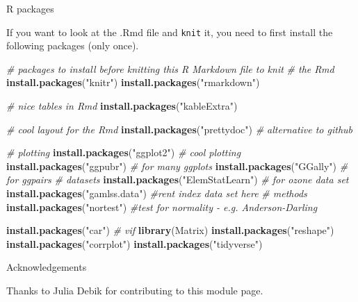 \documentclass[10pt,ignorenonframetext,]{beamer}
\newenvironment{Shaded}{\begin{snugshade}}{\end{snugshade}}
\newcommand{\KeywordTok}[1]{\textcolor[rgb]{0.13,0.29,0.53}{\textbf{#1}}}
\newcommand{\StringTok}[1]{\textcolor[rgb]{0.31,0.60,0.02}{#1}}
\newcommand{\CommentTok}[1]{\textcolor[rgb]{0.56,0.35,0.01}{\textit{#1}}}
\newcommand{\NormalTok}[1]{#1}
\begin{document}
\begin{frame}[fragile]{ R packages}

If you want to look at the .Rmd file and \texttt{knit} it, you need to
first install the following packages (only once).

\begin{Shaded}
\begin{Highlighting}[]
\CommentTok{# packages to install before knitting this R Markdown file to knit}
\CommentTok{# the Rmd}
\KeywordTok{install.packages}\NormalTok{(}\StringTok{"knitr"}\NormalTok{)}
\KeywordTok{install.packages}\NormalTok{(}\StringTok{"rmarkdown"}\NormalTok{)}

\CommentTok{# nice tables in Rmd}
\KeywordTok{install.packages}\NormalTok{(}\StringTok{"kableExtra"}\NormalTok{)}

\CommentTok{# cool layout for the Rmd}
\KeywordTok{install.packages}\NormalTok{(}\StringTok{"prettydoc"}\NormalTok{)  }\CommentTok{# alternative to github}

\CommentTok{# plotting}
\KeywordTok{install.packages}\NormalTok{(}\StringTok{"ggplot2"}\NormalTok{)  }\CommentTok{# cool plotting}
\KeywordTok{install.packages}\NormalTok{(}\StringTok{"ggpubr"}\NormalTok{)  }\CommentTok{# for many ggplots}
\KeywordTok{install.packages}\NormalTok{(}\StringTok{"GGally"}\NormalTok{)  }\CommentTok{# for ggpairs}
\CommentTok{# datasets}
\KeywordTok{install.packages}\NormalTok{(}\StringTok{"ElemStatLearn"}\NormalTok{)  }\CommentTok{# for ozone data set}
\KeywordTok{install.packages}\NormalTok{(}\StringTok{"gamlss.data"}\NormalTok{)  }\CommentTok{#rent index data set here}
\CommentTok{# methods}
\KeywordTok{install.packages}\NormalTok{(}\StringTok{"nortest"}\NormalTok{)  }\CommentTok{#test for normality - e.g. Anderson-Darling}

\KeywordTok{install.packages}\NormalTok{(}\StringTok{"car"}\NormalTok{)  }\CommentTok{# vif}
\KeywordTok{library}\NormalTok{(Matrix)}
\KeywordTok{install.packages}\NormalTok{(}\StringTok{"reshape"}\NormalTok{)}
\KeywordTok{install.packages}\NormalTok{(}\StringTok{"corrplot"}\NormalTok{)}
\KeywordTok{install.packages}\NormalTok{(}\StringTok{"tidyverse"}\NormalTok{)}
\end{Highlighting}
\end{Shaded}

\end{frame}

\begin{frame}{Acknowledgements}

Thanks to Julia Debik for contributing to this module page.

\end{frame}
\end{document}
